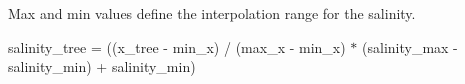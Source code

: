 Max and min values define the interpolation range for the salinity.

salinity\+\_\+tree = ((x\+\_\+tree -\/ min\+\_\+x) / (max\+\_\+x -\/ min\+\_\+x) $\ast$ (salinity\+\_\+max -\/ salinity\+\_\+min) + salinity\+\_\+min) 